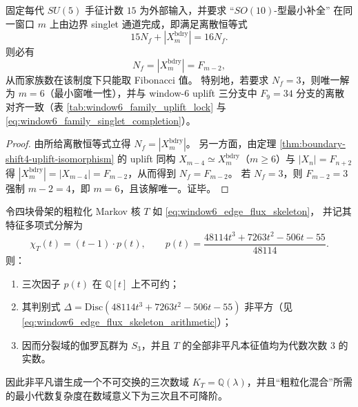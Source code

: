 \begin{theorem}[家族数的窗口量子化与最小窗唯一性：\texorpdfstring{$N_f=|X_m^{\mathrm{bdry}}|$}{Nf=|Xbdry|}]\label{thm:xi-family-number-window-quantization-minimal-window}
固定每代 \(SU(5)\) 手征计数 \(15\) 为外部输入，并要求 “\(SO(10)\)-型最小补全” 在同一窗口 \(m\) 上由边界 singlet 通道完成，即满足离散恒等式
\[
15N_f+|X_m^{\mathrm{bdry}}|=16N_f.
\]
则必有
\[
N_f=|X_m^{\mathrm{bdry}}|=F_{m-2},
\]
从而家族数在该制度下只能取 Fibonacci 值。
特别地，若要求 \(N_f=3\)，则唯一解为 \(m=6\)（最小窗唯一性），并与 window-\(6\) uplift 三分支中 \(F_9=34\) 分支的离散对齐一致（表 \ref{tab:window6_family_uplift_lock} 与 \eqref{eq:window6_family_singlet_completion}）。
\end{theorem}

\begin{proof}
由所给离散恒等式立得 \(N_f=|X_m^{\mathrm{bdry}}|\)。
另一方面，由定理 \ref{thm:boundary-shift4-uplift-isomorphism} 的 uplift 同构 \(X_{m-4}\simeq X_m^{\mathrm{bdry}}\)（\(m\ge 6\)）与 \(|X_n|=F_{n+2}\) 得
\(|X_m^{\mathrm{bdry}}|=|X_{m-4}|=F_{m-2}\)，从而得到 \(N_f=F_{m-2}\)。
若 \(N_f=3\)，则 \(F_{m-2}=3\) 强制 \(m-2=4\)，即 \(m=6\)，且该解唯一。证毕。
\end{proof}

\begin{theorem}\label{thm:xi-window6-four-block-kernel-cubic-field-s3}
令四块骨架的粗粒化 Markov 核 \(T\) 如 \eqref{eq:window6_edge_flux_skeleton}，
并记其特征多项式分解为
\[
\chi_T(t)=(t-1)\cdot p(t),
\qquad
p(t)=\frac{48114t^3+7263t^2-506t-55}{48114}.
\]
则：
\begin{enumerate}
  \item 三次因子 \(p(t)\) 在 \(\mathbb Q[t]\) 上不可约；
  \item 其判别式 \(\Delta=\mathrm{Disc}(48114t^3+7263t^2-506t-55)\) 非平方（见 \eqref{eq:window6_edge_flux_skeleton_arithmetic}）；
  \item 因而分裂域的伽罗瓦群为 \(S_3\)，并且 \(T\) 的全部非平凡本征值均为代数次数 \(3\) 的实数。
\end{enumerate}
因此非平凡谱生成一个不可交换的三次数域 \(K_T=\mathbb Q(\lambda)\)，并且“粗粒化混合”所需的最小代数复杂度在数域意义下为三次且不可降阶。
\end{theorem}

